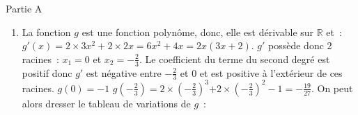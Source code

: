 \begin{corrige}
\begin{center}
     \begin{h3} Partie A \end{h3}
\end{center}
     \begin{enumerate}
          \item
          La fonction $ g $ est une fonction polynôme, donc, elle est dérivable sur  $  \mathbb{R}  $ et~:
          \newpar
          $ g'  (x) =2 \times 3x^2+2 \times 2x=6x^2 +4x$\nosp$=2x (3x+2).  $
          \newpar
          $ g'  $ possède donc 2 racines~:  $ x_{ 1 } =0 $ et $ x_{ 2 } =  - \frac{ 2 }{ 3 } . $
          \newpar
          Le coefficient du terme du second degré est positif donc $ g' $ est négative entre $   - \frac{ 2 }{ 3 }  $ et $ 0 $ et est positive à l'extérieur de ces racines.
          \newpar
          $ g (0) = - 1 $
          \newpar
          $ g  \left( -  \frac{ 2 }{ 3 }  \right)  =2 \times  \left(  -  \frac{ 2 }{ 3 }  \right) ^{3}$\nosp$ +2 \times  \left(  -  \frac{ 2 }{ 3 }  \right) ^2  - 1$\nosp$= -  \frac{ 19 }{ 27 } . $
          \newpar
          On peut alors dresser le tableau de variations  de  $ g $~:  \\
          \begin{center}
               \begin{extern}%
\end{extern}
\end{center}
\end{enumerate}
\end{corrige}
